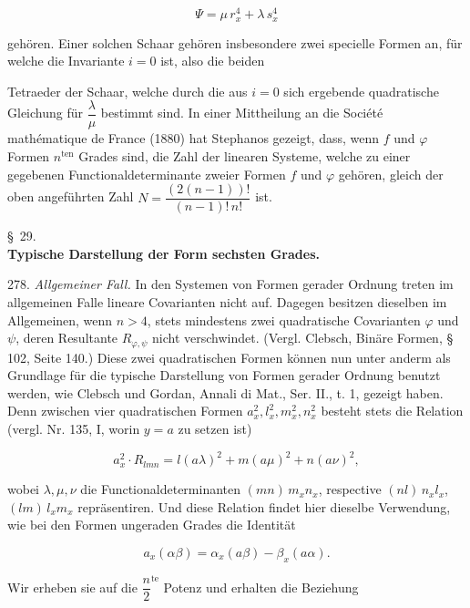\documentclass[11pt]{article}
\providecommand{\weberpage}[1]{}
\let\Psi\varPsi
\begin{document}
\[
\Psi = \mu\, r_x^4 + \lambda\, s_x^4
\]

gehören. Einer solchen Schaar gehören insbesondere zwei specielle Formen an, für welche die Invariante $i = 0$ ist, also die beiden


\weberpage{302}
Tetraeder der Schaar, welche durch die aus $i = 0$ sich ergebende quadratische Gleichung für $\dfrac{\lambda}{\mu}$ bestimmt sind. In einer Mittheilung an die Société mathématique de France (1880) hat Stephanos gezeigt, dass, wenn $f$ und $\varphi$ Formen $n^{\text{ten}}$ Grades sind, die Zahl der linearen Systeme, welche zu einer gegebenen Functionaldeterminante zweier Formen $f$ und $\varphi$ gehören, gleich der oben angeführten Zahl $N = \dfrac{(2(n-1))!}{(n-1)!\,n!}$ ist.

\begin{center}
\S~29.\\
\textbf{Typische Darstellung der Form sechsten Grades.}
\end{center}

278. \textit{Allgemeiner Fall.} In den Systemen von Formen gerader Ordnung treten im allgemeinen Falle lineare Covarianten nicht auf. Dagegen besitzen dieselben im Allgemeinen, wenn $n > 4$, stets mindestens zwei quadratische Covarianten $\varphi$ und $\psi$, deren Resultante $R_{\varphi,\psi}$ nicht verschwindet. (Vergl. Clebsch, \glqq Binäre Formen\grqq, § 102, Seite 140.) Diese zwei quadratischen Formen können nun unter anderm als Grundlage für die typische Darstellung von Formen gerader Ordnung benutzt werden, wie Clebsch und Gordan, Annali di Mat., Ser. II., t. 1, gezeigt haben. Denn zwischen vier quadratischen Formen $a_x^2, l_x^2, m_x^2, n_x^2$ besteht stets die Relation (vergl. Nr. 135, I, worin $y = a$ zu setzen ist)

\[
a_x^2 \cdot R_{lmn} = l(a\lambda)^2 + m(a\mu)^2 + n(a\nu)^2,
\]

wobei $\lambda, \mu, \nu$ die Functionaldeterminanten $(mn)\,m_xn_x$, respective $(nl)\,n_xl_x$, $(lm)\,l_xm_x$ repräsentiren. Und diese Relation findet hier dieselbe Verwendung, wie bei den Formen ungeraden Grades die Identität

\[
a_x(\alpha\beta) = \alpha_x(a\beta) - \beta_x(a\alpha).
\]

Wir erheben sie auf die $\dfrac{n}{2}^{\text{te}}$ Potenz und erhalten die Beziehung
\end{document}
